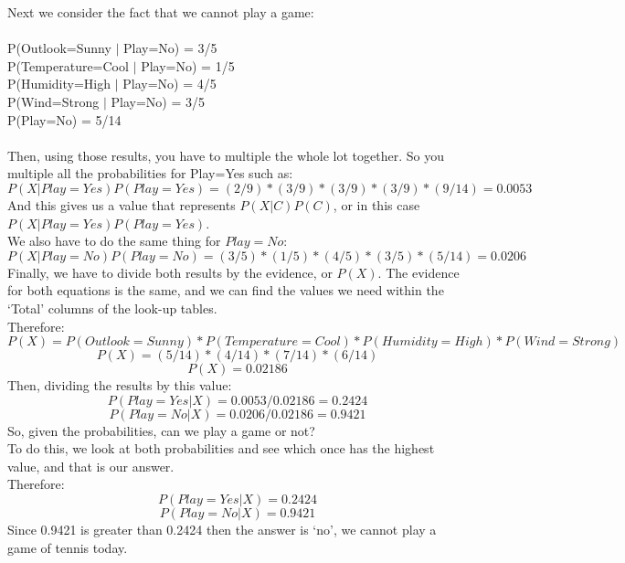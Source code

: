 Next we consider the fact that we cannot play a game:\\
\\P(Outlook=Sunny $|$ Play=No) = 3/5\\
P(Temperature=Cool $|$ Play=No) = 1/5\\
P(Humidity=High $|$ Play=No) = 4/5\\
P(Wind=Strong $|$ Play=No) = 3/5\\
P(Play=No) = 5/14\\
\\Then, using those results, you have to multiple the whole lot together. So you multiple all the probabilities for Play=Yes such as:
\[P(X|Play=Yes)P(Play=Yes) = (2/9) * (3/9) * (3/9) * (3/9) * (9/14) = 0.0053\]
And this gives us a value that represents \(P(X|C)P(C)\), or in this case \(P(X|Play=Yes)P(Play=Yes)\).\\
We also have to do the same thing for \(Play=No\):
\[P(X|Play=No)P(Play=No) = (3/5) * (1/5) * (4/5) * (3/5) * (5/14) = 0.0206\]
Finally, we have to divide both results by the evidence, or \(P(X)\). The evidence for both equations is the same, and we can find the values we need within the ‘Total’ columns of the look-up tables. \\Therefore:
\[P(X) = P(Outlook=Sunny) * P(Temperature=Cool) * P(Humidity=High) * P(Wind=Strong)\]
\[P(X) = (5/14) * (4/14) * (7/14) * (6/14)\]
\[P(X) = 0.02186\]
Then, dividing the results by this value:
\[P(Play=Yes | X) = 0.0053/0.02186 = 0.2424\]
\[P(Play=No | X) = 0.0206/0.02186 = 0.9421\]
So, given the probabilities, can we play a game or not? \\To do this, we look at both probabilities and see which once has the highest value, and that is our answer.\\ Therefore:\\
\[P(Play=Yes | X) = 0.2424\]
\[P(Play=No | X) = 0.9421\]
Since 0.9421 is greater than 0.2424 then the answer is ‘no’, we cannot play a game of tennis today.